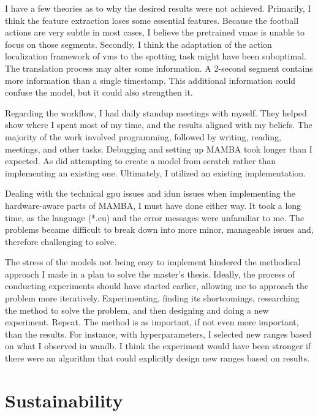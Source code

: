 I have a few theories as to why the desired results were not achieved. Primarily, I think the feature extraction loses some essential features. Because the football actions are very subtle in most cases, I believe the pretrained \acrshort{vmae} is unable to focus on those segments. Secondly, I think the adaptation of the action localization framework of \acrshort{vms} to the spotting task might have been suboptimal. The translation process may alter some information. A 2-second segment contains more information than a single timestamp. This additional information could confuse the model, but it could also strengthen it. 

Regarding the workflow, I had daily standup meetings with myself. They helped show where I spent most of my time, and the results aligned with my beliefs. The majority of the work involved programming, followed by writing, reading, meetings, and other tasks. Debugging and setting up MAMBA took longer than I expected. As did attempting to create a model from scratch rather than implementing an existing one. Ultimately, I utilized an existing implementation. 

Dealing with the technical \acrshort{gpu} issues and \acrshort{idun} issues when implementing the hardware-aware parts of MAMBA, I must have done either way. It took a long time, as the language (*.cu) and the error messages were unfamiliar to me. The problems became difficult to break down into more minor, manageable issues and, therefore challenging to solve. 

The stress of the models not being easy to implement hindered the methodical approach I made in a plan to solve the master's thesis. Ideally, the process of conducting experiments should have started earlier, allowing me to approach the problem more iteratively. Experimenting, finding its shortcomings, researching the method to solve the problem, and then designing and doing a new experiment. Repeat. The method is as important, if not even more important, than the results. For instance, with hyperparameters, I selected new ranges based on what I observed in \acrfull{wandb}. I think the experiment would have been stronger if there were an algorithm that could explicitly design new ranges based on results.

\section{Sustainability}


